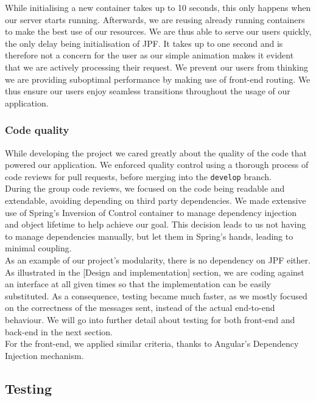\documentclass[titlepage,11pt]{article}
\begin{document}
While initialising a new container takes up to 10 seconds, this only happens when our server starts running. Afterwards, we are reusing already running containers to make the best use of our resources. We are thus able to serve our users quickly, the only delay being initialisation of JPF. It takes up to one second and is therefore not a concern for the user as our simple animation makes it evident that we are actively processing their request. We prevent our users from thinking we are providing suboptimal performance by making use of front-end routing. We thus ensure our users enjoy seamless transitions throughout the usage of our application.

\subsubsection{Code quality}

While developing the project we cared greatly about the quality of the code that powered our application. We enforced quality control using a thorough process of code reviews for pull requests, before merging into the \texttt{develop} branch. \\

\noindent During the group code reviews, we focused on the code being readable and extendable, avoiding depending on third party dependencies. We made extensive use of Spring's Inversion of Control container to manage dependency injection and object lifetime to help achieve our goal. This decision leads to us not having to manage dependencies manually, but let them in Spring's hands, leading to minimal coupling. \\

\noindent As an example of our project's modularity, there is no dependency on JPF either. As illustrated in the [Design and implementation] section, we are coding against an interface at all given times so that the implementation can be easily substituted. As a consequence, testing became much faster, as we mostly focused on the correctness of the messages sent, instead of the actual end-to-end behaviour. We will go into further detail about testing for both front-end and back-end in the next section. \\

\noindent For the front-end, we applied similar criteria, thanks to Angular's Dependency Injection mechanism. \\

\subsection{Testing}
\end{document}
